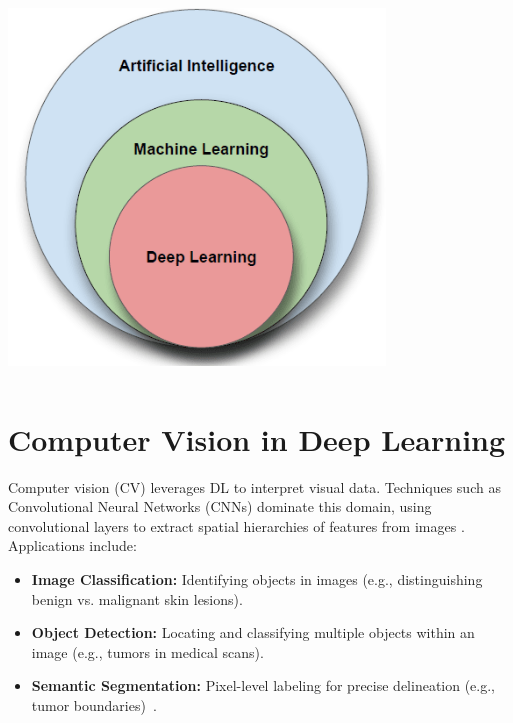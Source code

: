 \documentclass[a4paper,12pt]{report}
\begin{document}
\begin{spacing}{1.5}
    \begin{minipage}[lH]{0.8\textwidth}
        \centering
        \includegraphics[width=10cm, height=10cm]{Pics/deepLearning.png}
    \end{minipage} 
    \hspace{1cm}
    \begin{minipage}[rH]{0.1\textwidth}
        \cite{dlImg}    
    \end{minipage}
    
    \vspace{0.5cm}

    \section{Computer Vision in Deep Learning}
    Computer vision (CV) leverages DL to interpret visual data. Techniques such as Convolutional Neural Networks (CNNs) dominate this domain, using convolutional layers to extract spatial hierarchies of features from images \cite{dl3}. Applications include:
    \begin{itemize}
        \item \textbf{Image Classification:} Identifying objects in images (e.g., distinguishing benign vs. malignant skin lesions).
        \item \textbf{Object Detection:} Locating and classifying multiple objects within an image (e.g., tumors in medical scans).
        \item \textbf{Semantic Segmentation:} Pixel-level labeling for precise delineation (e.g., tumor boundaries)~\cite{dl4}.


\end{itemize}
\end{spacing}
\end{document}
